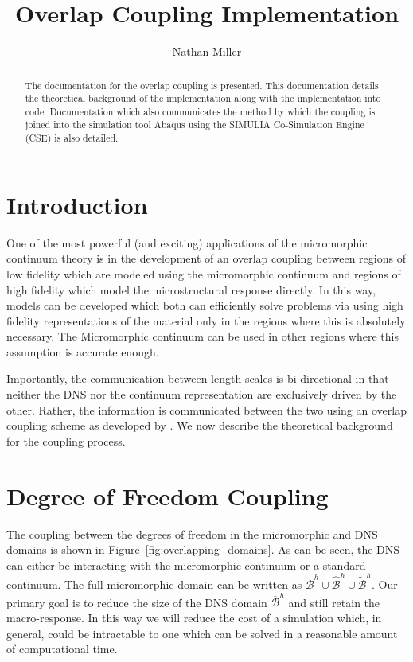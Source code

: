 \documentclass{asme2ej}
\begin{document}
\title{Overlap Coupling Implementation}
\author{Nathan Miller}

\maketitle

\begin{abstract}
The documentation for the overlap coupling is presented. This documentation details the theoretical background of the implementation along with the implementation into code. Documentation which also communicates the method by which the coupling is joined into the simulation tool Abaqus using the SIMULIA Co-Simulation Engine (CSE) is also detailed.
\end{abstract}



\section{Introduction}

One of the most powerful (and exciting) applications of the micromorphic continuum theory is in the development of an overlap coupling between regions of low fidelity which are modeled using the micromorphic continuum and regions of high fidelity which model the microstructural response directly. In this way, models can be developed which both can efficiently solve problems via using high fidelity representations of the material only in the regions where this is absolutely necessary. The Micromorphic continuum can be used in other regions where this assumption is accurate enough.

Importantly, the communication between length scales is bi-directional in that neither the DNS nor the continuum representation are exclusively driven by the other. Rather, the information is communicated between the two using an overlap coupling scheme as developed by \cite{bib:klein06}. We now describe the theoretical background for the coupling process.

\section{Degree of Freedom Coupling}

The coupling between the degrees of freedom in the micromorphic and DNS domains is shown in Figure~\ref{fig:overlapping_domains}. As can be seen, the DNS can either be interacting with the micromorphic continuum or a standard continuum. The full micromorphic domain can be written as $\overline{\mathcal{B}}^h \cup \hat{\mathcal{B}}^h \cup \tilde{\mathcal{B}}^h$. Our primary goal is to reduce the size of the DNS domain $\overline{\mathcal{B}}^h$ and still retain the macro-response. In this way we will reduce the cost of a simulation which, in general, could be intractable to one which can be solved in a reasonable amount of computational time.
\end{document}
